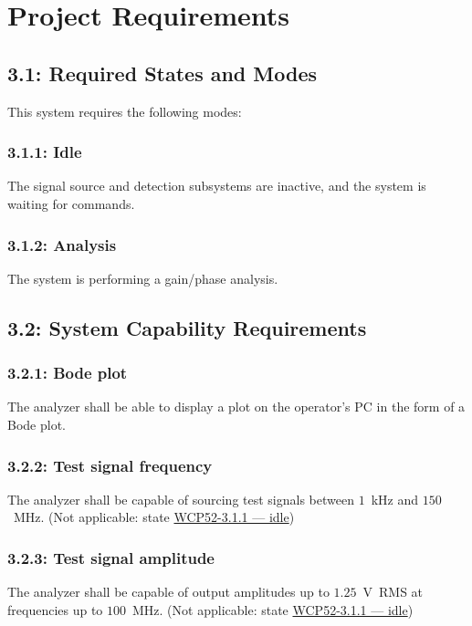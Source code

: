 \chapter{Project Requirements}
\label{chap:prs}

\section*{3.1: Required States and Modes}

This system requires the following modes:

\subsection*{3.1.1: Idle}
\label{prs:3.1.1}
The signal source and detection subsystems are inactive, and the system is waiting for commands.

\subsection*{3.1.2: Analysis}
\label{prs:3.1.2}
The system is performing a gain/phase analysis.

\section*{3.2: System Capability Requirements}

\subsection*{3.2.1: Bode plot}
\label{prs:3.2.1}
The analyzer shall be able to display a plot on the operator's PC in the form of a Bode plot.

\subsection*{3.2.2: Test signal frequency}
\label{prs:3.2.2}
The analyzer shall be capable of sourcing test signals between $1$~kHz and $150$~MHz.
(Not applicable: state \hyperref[prs:3.1.1]{WCP52-3.1.1 --- idle})

\subsection*{3.2.3: Test signal amplitude}
\label{prs:3.2.3}
The analyzer shall be capable of output amplitudes up to $1.25$~V~RMS at frequencies up to
$100$~MHz. (Not applicable: state \hyperref[prs:3.1.1]{WCP52-3.1.1 --- idle})

